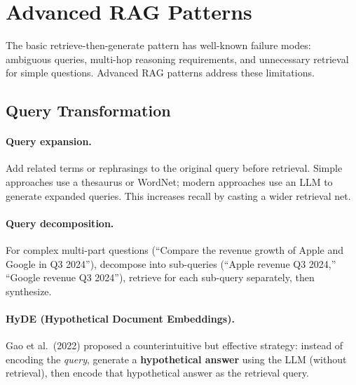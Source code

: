 \section{Advanced RAG Patterns}
\label{sec:advanced-rag}

The basic retrieve-then-generate pattern has well-known failure modes:
ambiguous queries, multi-hop reasoning requirements, and unnecessary retrieval
for simple questions.  Advanced RAG patterns address these limitations.

\subsection{Query Transformation}

\paragraph{Query expansion.}
Add related terms or rephrasings to the original query before retrieval.
Simple approaches use a thesaurus or WordNet; modern approaches use an LLM
to generate expanded queries.  This increases recall by casting a wider
retrieval net.

\paragraph{Query decomposition.}
For complex multi-part questions (``Compare the revenue growth of Apple and
Google in Q3 2024''), decompose into sub-queries (``Apple revenue Q3 2024,''
``Google revenue Q3 2024''), retrieve for each sub-query separately, then
synthesize.

\paragraph{HyDE (Hypothetical Document Embeddings).}
Gao et al.\ (2022) proposed a counterintuitive but effective strategy: instead
of encoding the \emph{query}, generate a \textbf{hypothetical answer} using the
LLM (without retrieval), then encode that hypothetical answer as the retrieval
query.

